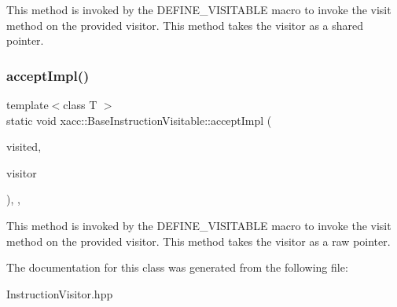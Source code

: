 This method is invoked by the D\+E\+F\+I\+N\+E\+\_\+\+V\+I\+S\+I\+T\+A\+B\+LE macro to invoke the visit method on the provided visitor. This method takes the visitor as a shared pointer. \mbox{\label{a02476_a80c7bb995faa54644f822fa48176c6cb}} 
\subsubsection{\texorpdfstring{accept\+Impl()}{acceptImpl()}\hspace{0.1cm}{\footnotesize\ttfamily [2/2]}}
{\footnotesize\ttfamily template$<$class T $>$ \\
static void xacc\+::\+Base\+Instruction\+Visitable\+::accept\+Impl (\begin{DoxyParamCaption}\item[{T \&}]{visited,  }\item[{\hyperlink{a02468}{Base\+Instruction\+Visitor} $\ast$}]{visitor }\end{DoxyParamCaption})\hspace{0.3cm}{\ttfamily [inline]}, {\ttfamily [static]}, {\ttfamily [protected]}}

This method is invoked by the D\+E\+F\+I\+N\+E\+\_\+\+V\+I\+S\+I\+T\+A\+B\+LE macro to invoke the visit method on the provided visitor. This method takes the visitor as a raw pointer. 

The documentation for this class was generated from the following file\+:\begin{DoxyCompactItemize}
\item 
Instruction\+Visitor.\+hpp\end{DoxyCompactItemize}
